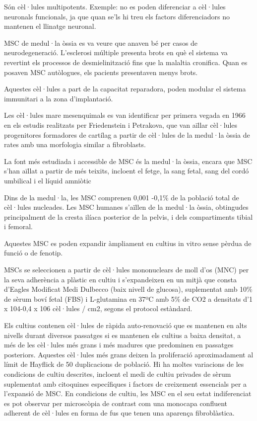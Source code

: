Són cèl·lules multipotents. Exemple: no es poden diferenciar a
cèl·lules neuronals funcionals, ja que quan se'ls hi treu els factors
diferenciadors no mantenen el llinatge neuronal.

MSC de medul·la òssia es va veure que anaven bé per casos de
neurodegeneració. L'esclerosi múltiple presenta brots en què el
sistema va revertint els processos de desmielinització fins que la
malaltia cronifica. Quan es posaven MSC autòlogues, els pacients 
presentaven menys brots. 

Aquestes cèl·lules a part de la capacitat reparadora, poden modular el
sistema immunitari a la zona d'implantació.

Les cèl·lules mare mesenquimals es van identificar per primera vegada
en 1966 en els estudis realitzats per Friedenstein i Petrakova, que
van aïllar cèl·lules progenitores formadores de cartílag a partir de
cèl·lules de la medul·la òssia de rates amb una morfologia similar a
fibroblasts.

La font més estudiada i accessible de MSC és la medul·la òssia, encara
que MSC s'han aïllat a partir de més teixits, incloent el fetge, la
sang fetal, sang del cordó umbilical i el líquid amniòtic

Dins de la medul·la, les MSC comprenen 0,001 -0,1\% de la població
total de cèl·lules nucleades. Les MSC humanes s'aïllen de la medul·la
òssia, obtingudes principalment de la cresta ilíaca posterior de la
pelvis, i dels compartiments tibial i femoral.

Aquestes MSC es poden expandir àmpliament en cultius in vitro sense
pèrdua de funció o de fenotip.

MSCs se seleccionen a partir de cèl·lules mononuclears de moll d'os
(MNC) per la seva adherència a plàstic en cultiu i s'expandeixen en un
mitjà que consta d'Eagles Modificat Medi Dulbecco (baix nivell de
glucosa), suplementat amb 10\% de sèrum boví fetal (FBS) i L-glutamina
en 37ºC amb 5\% de CO2 a densitats d'1 x 104-0,4 x 106 cèl·lules /
cm2, segons el protocol estàndard.

Els cultius contenen cèl·lules de ràpida auto-renovació que es
mantenen en alts nivells durant diversos passatges si es mantenen els
cultius a baixa densitat, a més de les cèl·lules més grans i més
madures que predominen en passatges posteriors. Aquestes cèl·lules més
grans deixen la proliferació aproximadament al límit de Hayflick de 50
duplicacions de població. Hi ha moltes variacions de les condicions de
cultiu descrites, incloent el medi de cultiu privades de sèrum
suplementat amb citoquines específiques i factors de creixement
essencials per a l'expansió de MSC. En condicions de cultiu, les MSC
en el seu estat indiferenciat es pot observar per microscòpia de
contrast com una monocapa confluent adherent de cèl·lules en forma de
fus que tenen una aparença fibroblàstica.

